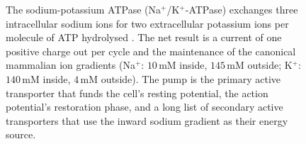 \begin{figure}[htbp]
\begin{tikzpicture}
\end{tikzpicture}
\caption[The sodium-potassium ATPase]{The sodium-potassium ATPase
(Na$^+$/K$^+$-ATPase) exchanges three intracellular sodium ions for
two extracellular potassium ions per molecule of ATP hydrolysed
\cite{paper:v6c01-skou-1957}. The net result is a current of one
positive charge out per cycle and the maintenance of the canonical
mammalian ion gradients (Na$^+$: $10\,\text{mM}$ inside,
$145\,\text{mM}$ outside; K$^+$: $140\,\text{mM}$ inside,
$4\,\text{mM}$ outside). The pump is the primary active transporter
that funds the cell's resting potential, the action potential's
restoration phase, and a long list of secondary active transporters
that use the inward sodium gradient as their energy source.}
\label{fig:vol06:ch01:na-k-pump}
\end{figure}
